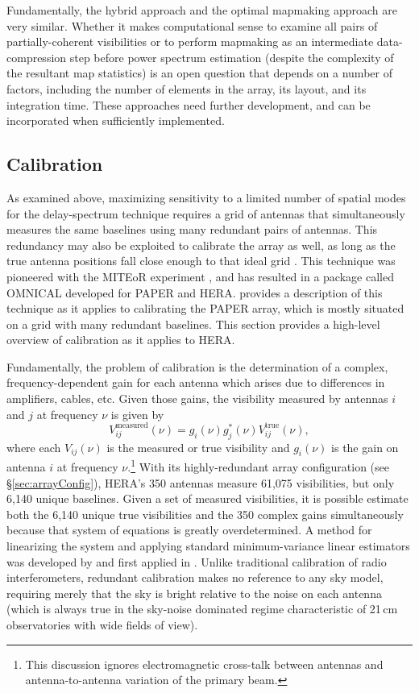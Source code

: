 \documentclass[preprint,11pt]{aastex}
\begin{document}
Fundamentally, the hybrid approach and the optimal mapmaking approach \citep{dillon_et_al2015a} are very similar. Whether it makes computational sense to examine all pairs of partially-coherent visibilities or to perform mapmaking as an intermediate data-compression step before power spectrum estimation (despite the complexity of the resultant map statistics) is an open question that depends on a number of factors, including the number of elements in the array, its layout, and its integration time.
These approaches need further development, and can be incorporated when sufficiently implemented.

\subsection{Calibration}
\label{sec:calibration}
As examined above, maximizing sensitivity to a limited number of spatial modes for the delay-spectrum technique requires a grid of antennas that simultaneously measures the same baselines using many redundant pairs of antennas. This redundancy may also be exploited to calibrate the array as well, as long as the true antenna positions fall close enough to that ideal grid \citep{liu_et_al2010}. This technique was pioneered with the MITEoR experiment \citep{zheng_et_al2014}, and has resulted in a package called OMNICAL developed for PAPER and HERA.  \citet{ali_et_al2015} provides a description of this technique as it applies to calibrating the PAPER array, which is mostly situated on a grid with many redundant baselines.  This section provides a high-level overview of calibration as it applies to HERA.

Fundamentally, the problem of calibration is the determination of a complex, frequency-dependent gain for each antenna which arises due to differences in amplifiers, cables, etc. Given those gains, the visibility measured by antennas $i$ and $j$ at frequency $\nu$ is given by 
\begin{equation}
V_{ij}^\text{measured}(\nu) = g_i(\nu) g_j^*(\nu) V_{ij}^\text{true}(\nu), 
\end{equation}
where each $V_{ij}(\nu)$ is the measured or true visibility and $g_i(\nu)$ is the gain on antenna $i$ at frequency $\nu$.\footnote{This discussion ignores electromagnetic cross-talk between antennas and antenna-to-antenna variation of the primary beam.} With its highly-redundant array configuration (see \S\ref{sec:arrayConfig}), HERA's 350 antennas measure 61,075 visibilities, but only 6,140 unique baselines. Given a set of measured visibilities, it is possible estimate both the 6,140 unique true visibilities and the 350 complex gains simultaneously because that system of equations is greatly overdetermined. A method for linearizing the system and applying standard minimum-variance linear estimators was developed by \citet{liu_et_al2010} and first applied in \citet{zheng_et_al2014}. Unlike traditional calibration of radio interferometers, redundant calibration makes no reference to any sky model, requiring merely that the sky is bright relative to the noise on each antenna (which is always true in the sky-noise dominated regime characteristic of 21\,cm observatories with wide fields of view). 
\end{document}
